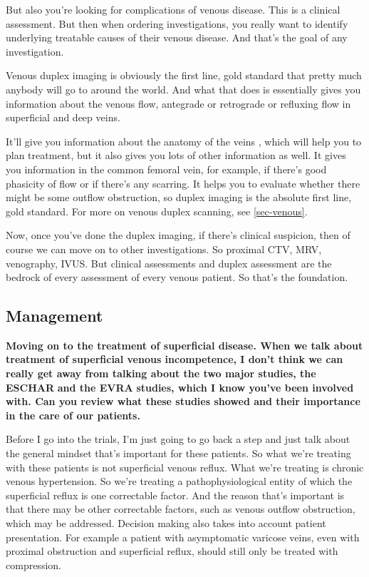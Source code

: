 \documentclass[
]{book}
\begin{document}
But also you're looking for complications of venous disease. This is a
clinical assessment. But then when ordering investigations, you really
want to identify underlying treatable causes of their venous disease.
And that's the goal of any investigation.

Venous duplex imaging is obviously the first line, gold standard that
pretty much anybody will go to around the world. And what that does is
essentially gives you information about the venous flow, antegrade or
retrograde or refluxing flow in superficial and deep veins.

It'll give you information about the anatomy of the veins , which will
help you to plan treatment, but it also gives you lots of other
information as well. It gives you information in the common femoral
vein, for example, if there's good phasicity of flow or if there's any
scarring. It helps you to evaluate whether there might be some outflow
obstruction, so duplex imaging is the absolute first line, gold
standard. For more on venous duplex scanning, see \ref{sec-venous}.

Now, once you've done the duplex imaging, if there's clinical suspicion,
then of course we can move on to other investigations. So proximal CTV,
MRV, venography, IVUS. But clinical assessments and duplex assessment
are the bedrock of every assessment of every venous patient. So that's
the foundation.

\hypertarget{management-29}{%
\subsection{Management}\label{management-29}}

\textbf{Moving on to the treatment of superficial disease. When we talk about
treatment of superficial venous incompetence, I don't think we can
really get away from talking about the two major studies, the
ESCHAR}\citep{gohel2007} \textbf{and the EVRA}\citep{gohel2018} \textbf{studies, which I
know you've been involved with. Can you review what these studies showed
and their importance in the care of our patients.}

Before I go into the trials, I'm just going to go back a step and just
talk about the general mindset that's important for these patients. So
what we're treating with these patients is not superficial venous
reflux. What we're treating is chronic venous hypertension. So we're
treating a pathophysiological entity of which the superficial reflux is
one correctable factor. And the reason that's important is that there
may be other correctable factors, such as venous outflow obstruction,
which may be addressed. Decision making also takes into account patient
presentation. For example a patient with asymptomatic varicose veins,
even with proximal obstruction and superficial reflux, should still only
be treated with compression.\citep{vandenboezem2011, wittens2015}
\end{document}
